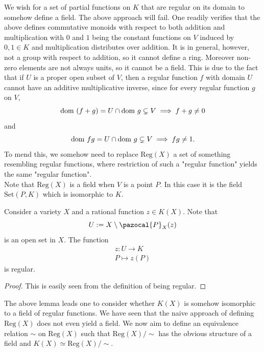     \begin{remark}
        We wish for a set of partial functions on $K$ that are regular on its domain to somehow define a field. The above approach will fail. One readily verifies that the above defines commutative monoids with respect to both addition and multiplication with $0$ and $1$ being the constant functions on $V$ induced by $0,1\in K$ and multiplication distributes over addition. It is in general, however, not a group with respect to addition, so it cannot define a ring. Moreover non-zero elements are not always units, so it cannot be a field. This is due to the fact that if $U$ is a proper open subset of $V$, then a regular function $f$ with domain $U$ cannot have an additive multiplicative inverse, since for every regular function $g$ on $V$,
        $$
            \mathrm{dom}\ (f+g) = U\cap \mathrm{dom} \ g \subsetneq V \implies f+g \neq 0
        $$  
        and 
        $$
            \mathrm{dom} \ fg = U\cap \mathrm{dom} \ g \subsetneq V \implies fg\neq 1.
        $$
        To mend this, we somehow need to replace $\mathrm{Reg}(X)$ a set of something resembling regular functions, where restriction of such a "regular function" yields the same "regular function".\\
        Note that $\mathrm{Reg}(X)$ is a field when $V$ is a point $P$. In this case it is the field $\mathrm{Set}(P,K)$ which is isomorphic to $K$. 
    \end{remark}
    \begin{lemma}\label{RationalFunctionIsRegularOnSomeOpenSet}
        Consider a variety $X$ and a rational function $z\in K(X)$. Note that
        $$
            U:= X\setminus \pazocal{P}_X(z)
        $$
        is an open set in $X$. The function 
        \begin{gather*}
            z : U \rightarrow K\\
            P \mapsto z(P)
        \end{gather*}
        is regular.
    \end{lemma}
    \begin{proof}
        This is easily seen from the definition of being regular. 
    \end{proof}
    The above lemma leads one to consider whether $K(X)$ is somehow isomorphic to a field of regular functions. We have seen that the naive approach of defining $\mathrm{Reg}(X)$ does not even yield a field. We now aim to define an equivalence relation $\sim$ on $\mathrm{Reg}(X)$ such that $\mathrm{Reg}(X)/\sim$ has the obvious structure of a field and $K(X) \simeq \mathrm{Reg}(X)/\sim$.

